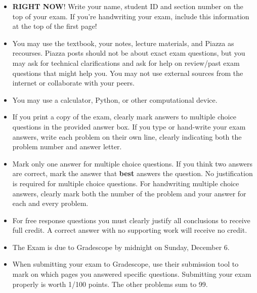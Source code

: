 \documentclass[addpoints]{exam}
\begin{document}
\begin{itemize}                        %
	\item {\bf RIGHT NOW}! Write your name, student ID and section number on the top of your exam. If you're handwriting your exam, include this information at the top of the first page!
	\item You may use the textbook, your notes, lecture materials, and Piazza as recourses.  Piazza posts should not be about exact exam questions, but you may ask for technical clarifications and ask for help on review/past exam questions that might help you.  You may not use external sources from the internet or collaborate with your peers.
	\item You may use a calculator, Python, or other computational device.
	\item If you print a copy of the exam, clearly mark answers to multiple choice questions in the provided answer box. If you type or hand-write your exam answers, write each problem on their own line, clearly indicating both the problem number and answer letter.
	\item Mark only one answer for multiple choice questions.  If you think two answers are correct, mark the answer that {\bf best} answers the question.  No justification is required for multiple choice questions.  For handwriting multiple choice answers, clearly mark both the number of the problem and your answer for each and every problem. 
	\item For free response questions you must clearly justify all conclusions to receive full credit.  A correct answer with no supporting work will receive no credit. 
	\item The Exam is due to Gradescope by midnight on Sunday, December 6.
	\item When submitting your exam to Gradescope, use their submission tool to mark on which pages you answered specific questions.  Submitting your exam properly is worth 1/100 points.  The other problems sum to 99.
\end{itemize}
\clearpage

\end{document}
